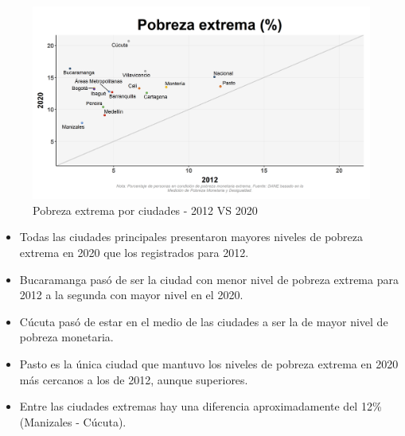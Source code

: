     \begin{figure}[H]
        \caption{Pobreza extrema por ciudades - 2012 VS 2020 \label{map_result_2} }
        \begin{center}
        \includegraphics[width=\textwidth,keepaspectratio]{img/var_257_scatter_time.png}
        \end{center}
    \end{figure}
            \begin{itemize}
                    \item Todas las ciudades principales presentaron mayores niveles de pobreza extrema en 2020 que los registrados para 2012.
                    \item Bucaramanga pasó de ser la ciudad con menor nivel de pobreza extrema para 2012 a la segunda con mayor nivel en el 2020.
                    \item Cúcuta pasó de estar en el medio de las ciudades a ser la de mayor nivel de pobreza monetaria.
                    \item Pasto es la única ciudad que mantuvo los niveles de pobreza extrema en 2020 más cercanos a los de 2012, aunque superiores.
                    \item Entre las ciudades extremas hay una diferencia aproximadamente del 12\% (Manizales - Cúcuta).
                    \end{itemize}

